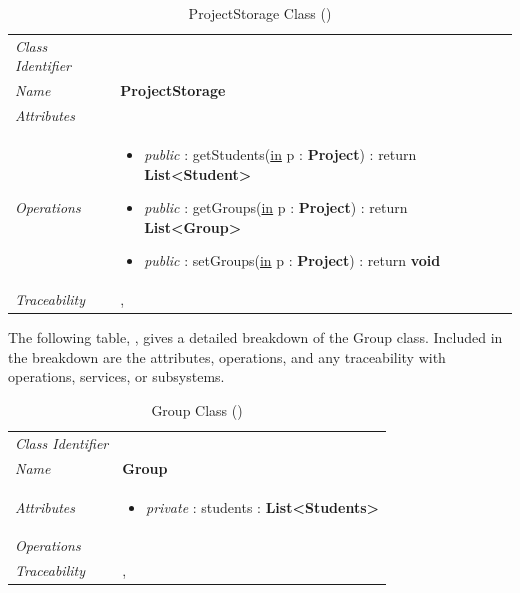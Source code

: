 \documentclass[12pt,letterpaper]{article}
\begin{document}
\begin{table}[H]
    \caption{ProjectStorage Class ()} 
	\begin{tabu} to 
		\toprule
		Class Identifier &  \\
		Name & {\bf ProjectStorage} \\
		Attributes & \\

		Operations &
		\begin{minipage}[t]{\linewidth}
			\begin{itemize}
			    \item {\it public} : getStudents(\underline{in} p : {\bf Project}) : return {\bf List<Student>}
			    \item {\it public} : getGroups(\underline{in} p : {\bf Project}) : return {\bf List<Group>}
			    \item {\it public} : setGroups(\underline{in} p : {\bf Project}) : return {\bf void}
	        \end{itemize}
	    \end{minipage} \\
	    	Traceability & , \\
		\toprule
	\end{tabu}
\end{table}

\newpage{}

The following table, , gives a detailed breakdown of the Group class. Included in the breakdown are the attributes, operations, and any traceability with operations, services, or subsystems.

\begin{table}[H]
    \caption{Group Class ()} 
	\begin{tabu} to 
		\toprule
		Class Identifier &  \\
		Name & {\bf Group} \\
		Attributes & 
		\begin{minipage}[t]{\linewidth}
		    \begin{itemize}
		        \item \textit{private} : students : {\bf List<Students>}
			\end{itemize}
	    \end{minipage} \\

		Operations &\\
	    	Traceability & , \\
		\toprule
	\end{tabu}
\end{table}
\end{document}
